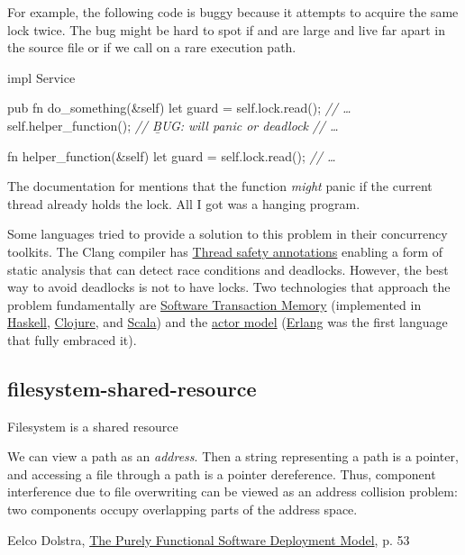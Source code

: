 \documentclass{article}
\begin{document}
For example, the following code is buggy because it attempts to acquire the same lock twice.
The bug might be hard to spot if  and  are large and live far apart in the source file or if we call  on a rare execution path.

\begin{code}[bad]
impl Service {
  pub fn do_something(&self) {
    let guard = self.lock.read();
    \emph{// \ldots }
    self.helper_function(); \emph{// \b{BUG}: will panic or deadlock}
    \emph{// \ldots }
  }

  fn helper_function(&self) {
    let guard = self.lock.read();
    \emph{// \ldots }
  }
}
\end{code}

The documentation for \href{https://doc.rust-lang.org/std/sync/struct.RwLock.html#method.read}{} mentions that the function \emph{might} panic if the current thread already holds the lock.
All I got was a hanging program.

Some languages tried to provide a solution to this problem in their concurrency toolkits.
The Clang compiler has \href{https://clang.llvm.org/docs/ThreadSafetyAnalysis.html}{Thread safety annotations} enabling a form of static analysis that can detect race conditions and deadlocks.
However, the best way to avoid deadlocks is not to have locks.
Two technologies that approach the problem fundamentally are \href{https://en.wikipedia.org/wiki/Software_transactional_memory}{Software Transaction Memory} (implemented in \href{https://wiki.haskell.org/Software_transactional_memory}{Haskell}, \href{https://clojure.org/reference/refs}{Clojure}, and \href{https://nbronson.github.io/scala-stm/}{Scala}) and the \href{https://en.wikipedia.org/wiki/Actor_model}{actor model} (\href{https://www.erlang.org/}{Erlang} was the first language that fully embraced it).

\subsection{filesystem-shared-resource}{Filesystem is a shared resource}
\epigraph{
    We can view a path as an \emph{address}.
    Then a string representing a path is a pointer, and accessing a file through a path is a pointer dereference.
    Thus, component interference due to file overwriting can be viewed as an address collision problem: two components occupy overlapping parts of the address space.
}{Eelco Dolstra, \href{https://edolstra.github.io/pubs/phd-thesis.pdf}{The Purely Functional Software Deployment Model}, p. 53}
\end{document}
